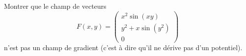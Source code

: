 
\begin{exercice}\label{exoOutilsMath-0059}

    Montrer que le champ de vecteurs
    \begin{equation}
        F(x,y)=\begin{pmatrix}
            x^2\sin(xy)    \\ 
            y^2+x\sin(y^2)    \\ 
            0    
        \end{pmatrix}
    \end{equation}
    n'est pas un champ de gradient (c'est à dire qu'il ne dérive pas d'un potentiel).

\end{exercice}
